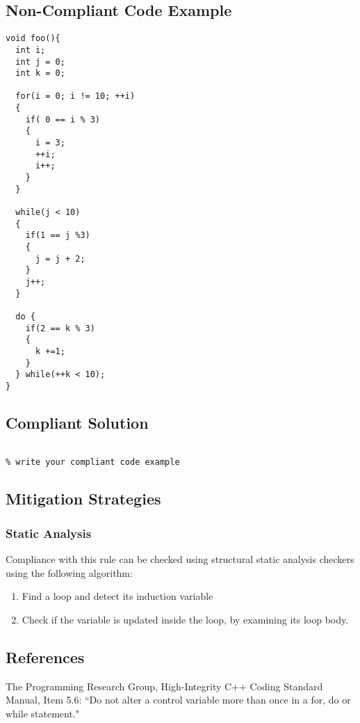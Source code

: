 \subsection{Non-Compliant Code Example}


\begin{verbatim}
void foo(){
  int i;
  int j = 0;
  int k = 0;

  for(i = 0; i != 10; ++i)
  {
    if( 0 == i % 3)
    {
      i = 3;
      ++i;
      i++;
    }
  }

  while(j < 10)
  {
    if(1 == j %3)
    {
      j = j + 2;
    }
    j++;
  }

  do {
    if(2 == k % 3)
    {
      k +=1;
    }
  } while(++k < 10);
}
\end{verbatim}

\subsection{Compliant Solution}


\begin{verbatim}

% write your compliant code example

\end{verbatim}

\subsection{Mitigation Strategies}
\subsubsection{Static Analysis} 

Compliance with this rule can be checked using structural static analysis checkers using the following algorithm:

\begin{enumerate}
\item Find a loop and detect its induction variable
\item Check if the variable is updated inside the loop, by examining its loop body.
\end{enumerate}

\subsection{References}

The Programming Research Group, High-Integrity C++ Coding Standard Manual, Item 5.6: ``Do not alter a control variable more than once in a for, do or while statement."
